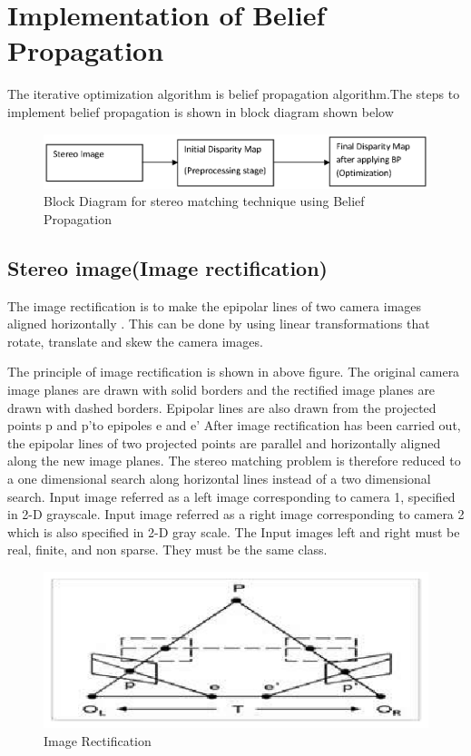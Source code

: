 \chapter{Implementation of Belief Propagation}
The iterative optimization algorithm is belief propagation algorithm.The steps to implement belief propagation is shown in block diagram shown below
\begin{figure}[h]
\begin{center}
\includegraphics[width=5.5in]{bk.eps}
\caption{Block Diagram for stereo matching technique using Belief Propagation}\label{lined}
\end{center}
\end{figure}
\section{Stereo image(Image rectification)}
The image rectification is to make the epipolar  lines of two camera images aligned horizontally . This can be done by using linear transformations that rotate, translate and skew the camera images.

The principle of image rectification is shown in above figure. The original camera image planes are drawn with solid borders and the rectified image planes are drawn with dashed borders. \newline Epipolar lines are also drawn from the projected points p and p'to epipoles e and e'
After image rectification has been carried out, the epipolar lines of two projected points are parallel and horizontally aligned along the new image planes. The stereo matching problem is therefore reduced to a one dimensional search along horizontal lines instead of a two dimensional search.
\newline Input image referred as a left image corresponding to camera 1, specified in 2-D grayscale. Input image referred as  a right image  corresponding to camera 2 which is also specified in 2-D gray scale. The Input images left and right must be real, finite, and non sparse. They must be the same class.
\begin{figure}[h]
\begin{center}
\includegraphics[width=4.5in]{epipolar1.eps}
\caption{Image Rectification}\label{lined}
\end{center}
\end{figure}

